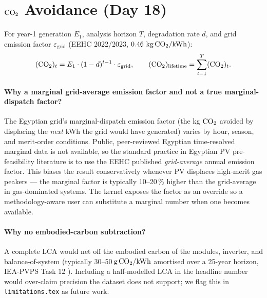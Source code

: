 \section{\texorpdfstring{$\mathrm{CO_{2}}$}{CO2} Avoidance (Day 18)}
\label{sec:co2}

For year-1 generation $E_1$, analysis horizon $T$, degradation rate
$d$, and grid emission factor $\varepsilon_{\text{grid}}$
(EEHC 2022/2023, $0.46~\mathrm{kg\,\mathrm{CO_{2}}/kWh}$):
\begin{equation}
(\mathrm{CO_{2}})_t = E_1 \cdot (1 - d)^{t-1} \cdot \varepsilon_{\text{grid}},
\qquad
(\mathrm{CO_{2}})_{\text{lifetime}} = \sum_{t=1}^{T} (\mathrm{CO_{2}})_t.
\label{eq:co2}
\end{equation}

\paragraph{Why a marginal grid-average emission factor and not a
true marginal-dispatch factor?}
The Egyptian grid's marginal-dispatch emission factor (the kg
$\mathrm{CO_{2}}$ avoided by displacing the \emph{next} kWh the grid would
have generated) varies by hour, season, and merit-order conditions.
Public, peer-reviewed Egyptian time-resolved marginal data is not
available, so the standard practice in Egyptian PV pre-feasibility
literature \citep{mahmoud2023} is to use the EEHC published
\emph{grid-average} annual emission factor. This biases the result
conservatively whenever PV displaces high-merit gas peakers --- the
marginal factor is typically 10--20\,\% higher than the grid-average
in gas-dominated systems. The kernel exposes the factor as an
override so a methodology-aware user can substitute a marginal
number when one becomes available.

\paragraph{Why no embodied-carbon subtraction?}
A complete LCA would net off the embodied carbon of the modules,
inverter, and balance-of-system (typically
30--50\,$\mathrm{g\,\mathrm{CO_{2}}/kWh}$ amortised over a 25-year horizon,
IEA-PVPS Task 12 \citep{ieapvps2020}). Including a half-modelled LCA
in the headline number would over-claim precision the dataset does
not support; we flag this in \texttt{limitations.tex} as future work.

